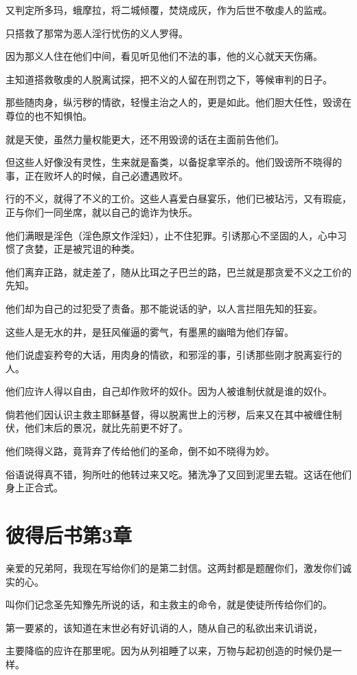 \documentclass[12pt,oneside]{book}
\begin{document}
又判定所多玛，蛾摩拉，将二城倾覆，焚烧成灰，作为后世不敬虔人的监戒。

只搭救了那常为恶人淫行忧伤的义人罗得。

因为那义人住在他们中间，看见听见他们不法的事，他的义心就天天伤痛。

主知道搭救敬虔的人脱离试探，把不义的人留在刑罚之下，等候审判的日子。

那些随肉身，纵污秽的情欲，轻慢主治之人的，更是如此。他们胆大任性，毁谤在尊位的也不知惧怕。

就是天使，虽然力量权能更大，还不用毁谤的话在主面前告他们。

但这些人好像没有灵性，生来就是畜类，以备捉拿宰杀的。他们毁谤所不晓得的事，正在败坏人的时候，自己必遭遇败坏。

行的不义，就得了不义的工价。这些人喜爱白昼宴乐，他们已被玷污，又有瑕疵，正与你们一同坐席，就以自己的诡诈为快乐。

他们满眼是淫色（淫色原文作淫妇），止不住犯罪。引诱那心不坚固的人，心中习惯了贪婪，正是被咒诅的种类。

他们离弃正路，就走差了，随从比珥之子巴兰的路，巴兰就是那贪爱不义之工价的先知。

他们却为自己的过犯受了责备。那不能说话的驴，以人言拦阻先知的狂妄。

这些人是无水的井，是狂风催逼的雾气，有墨黑的幽暗为他们存留。

他们说虚妄矜夸的大话，用肉身的情欲，和邪淫的事，引诱那些刚才脱离妄行的人。

他们应许人得以自由，自己却作败坏的奴仆。因为人被谁制伏就是谁的奴仆。

倘若他们因认识主救主耶稣基督，得以脱离世上的污秽，后来又在其中被缠住制伏，他们末后的景况，就比先前更不好了。

他们晓得义路，竟背弃了传给他们的圣命，倒不如不晓得为妙。

俗语说得真不错，狗所吐的他转过来又吃。猪洗净了又回到泥里去辊。这话在他们身上正合式。

\chapter{彼得后书第3章}
亲爱的兄弟阿，我现在写给你们的是第二封信。这两封都是题醒你们，激发你们诚实的心。

叫你们记念圣先知豫先所说的话，和主救主的命令，就是使徒所传给你们的。

第一要紧的，该知道在末世必有好讥诮的人，随从自己的私欲出来讥诮说，

主要降临的应许在那里呢。因为从列祖睡了以来，万物与起初创造的时候仍是一样。
\end{document}
